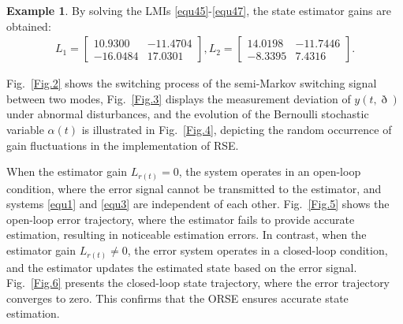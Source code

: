 \documentclass[preprint,review,fleqn,sort&compress,3p]{elsarticle}
\theoremstyle{definition}%
\newtheorem{example}{Example}
\begin{document}
\begin{example}
By solving the LMIs \eqref{equ45}-\eqref{equ47}, the state estimator gains are obtained:
\begin{align*}
	L_1=\begin{bmatrix}
		10.9300&-11.4704\\-16.0484&17.0301
	\end{bmatrix},
	L_2=\begin{bmatrix}
		14.0198&-11.7446\\-8.3395&7.4316
	\end{bmatrix}.
\end{align*}

Fig.~\ref{Fig.2} shows the switching process of the semi-Markov switching signal between two modes, {\color{red}Fig.~\ref{Fig.3} displays the measurement deviation of $y(t,\eth)$ under abnormal disturbances,} and the evolution of the Bernoulli stochastic variable $\alpha(t)$ is illustrated in Fig.~\ref{Fig.4}, depicting the random occurrence of gain fluctuations in the implementation of RSE.

{\color{red}When the estimator gain $L_{r(t)}=0$, the system operates in an open-loop condition, where the error signal cannot be transmitted to the estimator, and systems \eqref{equ1} and \eqref{equ3} are independent of each other.} Fig.~\ref{Fig.5} shows the open-loop error trajectory, where the estimator fails to provide accurate estimation, resulting in noticeable estimation errors. In contrast,{\color{red} when the estimator gain $L_{r(t)} \neq 0$, the error system operates in a closed-loop condition, and the estimator updates the estimated state based on the error signal.} Fig.~\ref{Fig.6} presents the closed-loop state trajectory, where the error trajectory converges to zero. This confirms that the ORSE ensures accurate state estimation.


\end{example}
\end{document}
